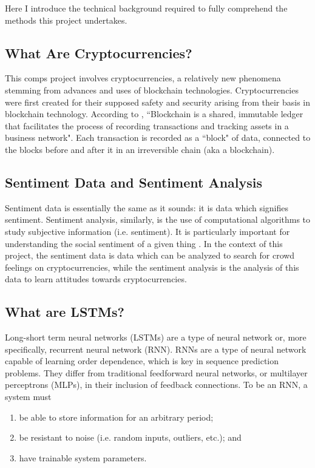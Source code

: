 \documentclass[10pt,twocolumn]{article}
\begin{document}
Here I introduce the technical background required to fully comprehend the methods this project undertakes.

\subsection{What Are Cryptocurrencies?}

This comps project involves cryptocurrencies, a relatively new phenomena stemming from advances and uses of blockchain technologies. Cryptocurrencies were first created for their supposed safety and security arising from their basis in blockchain technology. According to , ``Blockchain is a shared, immutable ledger that facilitates the process of recording transactions and tracking assets in a business network". Each transaction is recorded as a ``block" of data, connected to the blocks before and after it in an irreversible chain (aka a blockchain).

\subsection{Sentiment Data and Sentiment Analysis}

Sentiment data is essentially the same as it sounds: it is data which signifies sentiment. Sentiment analysis, similarly, is the use of computational algorithms to study subjective information (i.e. sentiment). It is particularly important for understanding the social sentiment of a given thing \cite{SentimentAnalysisConcept}. In the context of this project, the sentiment data is data which can be analyzed to search for crowd feelings on cryptocurrencies, while the sentiment analysis is the analysis of this data to learn attitudes towards cryptocurrencies.

\subsection{What are LSTMs?}

Long-short term neural networks (LSTMs) are a type of neural network or, more specifically, recurrent neural network (RNN). RNNs are a type of neural network capable of learning order dependence, which is key in sequence prediction problems. They differ from traditional feedforward neural networks, or multilayer perceptrons (MLPs), in their inclusion of feedback connections. To be an RNN, a system must

\begin{enumerate}
    \item be able to store information for an arbitrary period;
    \item be resistant to noise (i.e. random inputs, outliers, etc.); and
    \item have trainable system parameters.
\end{enumerate}
\end{document}
